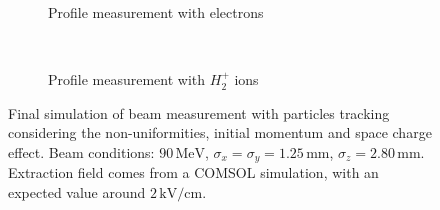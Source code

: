 \begin{figure}[!ht]
	\begin{subfigure}[t]{0.5\textwidth}
		
		\caption{Profile measurement with electrons}
		\label{}
	\end{subfigure}
	~
	\begin{subfigure}[t]{0.5\textwidth}
		
		\caption{Profile measurement with $H^{+}_{2}$ ions}
		\label{}
	\end{subfigure}
  \caption[Final simulation of beam measurement with particles tracking considering the non-uniformities, initial momentum and space charge effect.]{Final simulation of beam measurement with particles tracking considering the non-uniformities, initial momentum and space charge effect. Beam conditions: $90\,\mathrm{MeV}$, $\sigma_{x}=\sigma_{y}=1.25\,\mathrm{mm}$, $\sigma_{z} = 2.80\,\mathrm{mm}$. Extraction field comes from a COMSOL simulation, with an expected value around $2\,\mathrm{kV/cm}$.}
	\label{chap3:fig:SC_profile}
\end{figure}
